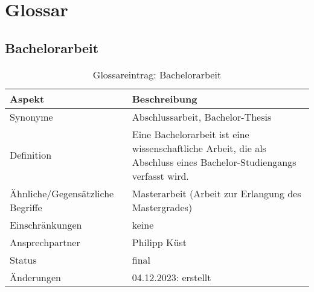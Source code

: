 \chapter{Glossar}\label{ch:glossar}


\section{Bachelorarbeit}\label{sec:glossar_bachelorarbeit}
\begin{table}[H]
    \label{tab:glossar_bachelorarbeit}
    \begin{tabularx}{\textwidth}{|l|X|}
        \hline
        \textbf{Aspekt}                  & \textbf{Beschreibung}                                                                                               \\
        \hline
        Synonyme                         & Abschlussarbeit, Bachelor-Thesis                                                                                    \\
        \hline
        Definition                       & Eine Bachelorarbeit ist eine wissenschaftliche Arbeit, die als Abschluss eines Bachelor-Studiengangs verfasst wird. \\
        \hline
        Ähnliche/Gegensätzliche Begriffe & Masterarbeit (Arbeit zur Erlangung des Mastergrades)                                                                \\
        \hline
        Einschränkungen                  & keine                                                                                                               \\
        \hline
        Ansprechpartner                  & Philipp Küst                                                                                                        \\
        \hline
        Status                           & final                                                                                                               \\
        \hline
        Änderungen                       & 04.12.2023: erstellt                                                                                                \\
        \hline
    \end{tabularx}
    \caption{Glossareintrag: Bachelorarbeit}
\end{table}


